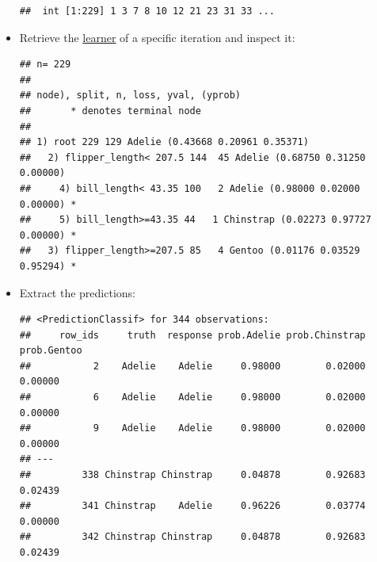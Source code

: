 \documentclass[
]{scrbook}
\newenvironment{Shaded}{\begin{snugshade}}{\end{snugshade}}
\newcommand{\CommentTok}[1]{\textcolor[rgb]{0.56,0.35,0.01}{\textit{#1}}}
\newcommand{\DecValTok}[1]{\textcolor[rgb]{0.00,0.00,0.81}{#1}}
\newcommand{\FunctionTok}[1]{\textcolor[rgb]{0.00,0.00,0.00}{#1}}
\newcommand{\NormalTok}[1]{#1}
\newcommand{\OtherTok}[1]{\textcolor[rgb]{0.56,0.35,0.01}{#1}}
\newcommand{\SpecialCharTok}[1]{\textcolor[rgb]{0.00,0.00,0.00}{#1}}
\renewenvironment{Shaded} {\begin{snugshade}\small} {\end{snugshade}}
\begin{document}
\begin{itemize}
\begin{verbatim}
##  int [1:229] 1 3 7 8 10 12 21 23 31 33 ...
\end{verbatim}
\item
  Retrieve the \protect\hyperlink{learners}{learner} of a specific iteration and inspect it:

\begin{Shaded}
\end{Shaded}

\begin{verbatim}
## n= 229 
## 
## node), split, n, loss, yval, (yprob)
##       * denotes terminal node
## 
## 1) root 229 129 Adelie (0.43668 0.20961 0.35371)  
##   2) flipper_length< 207.5 144  45 Adelie (0.68750 0.31250 0.00000)  
##     4) bill_length< 43.35 100   2 Adelie (0.98000 0.02000 0.00000) *
##     5) bill_length>=43.35 44   1 Chinstrap (0.02273 0.97727 0.00000) *
##   3) flipper_length>=207.5 85   4 Gentoo (0.01176 0.03529 0.95294) *
\end{verbatim}
\item
  Extract the predictions:

\begin{Shaded}
\end{Shaded}

\begin{verbatim}
## <PredictionClassif> for 344 observations:
##     row_ids     truth  response prob.Adelie prob.Chinstrap prob.Gentoo
##           2    Adelie    Adelie     0.98000        0.02000     0.00000
##           6    Adelie    Adelie     0.98000        0.02000     0.00000
##           9    Adelie    Adelie     0.98000        0.02000     0.00000
## ---                                                                   
##         338 Chinstrap Chinstrap     0.04878        0.92683     0.02439
##         341 Chinstrap    Adelie     0.96226        0.03774     0.00000
##         342 Chinstrap Chinstrap     0.04878        0.92683     0.02439
\end{verbatim}


\end{itemize}
\end{document}
